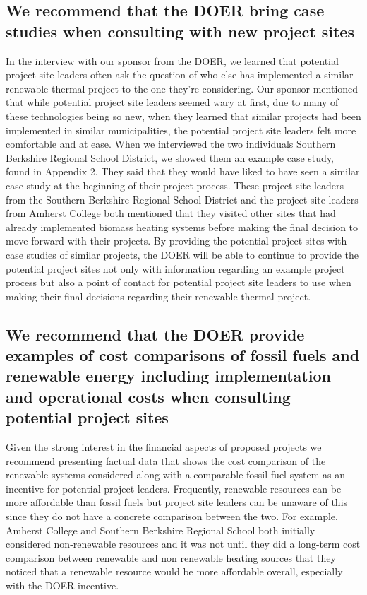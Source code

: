 \subsection{We recommend that the DOER bring case studies when consulting with new project sites}
\par In the interview with our sponsor from the DOER, we learned that potential project site leaders often ask the question of who else has implemented a similar renewable thermal project to the one they’re considering. Our sponsor mentioned that while potential project site leaders seemed wary at first, due to many of these technologies being so new, when they learned that similar projects had been implemented in similar municipalities, the potential project site leaders felt more comfortable and at ease. When we interviewed the two individuals Southern Berkshire Regional School District, we showed them an example case study, found in Appendix 2. They said that they would have liked to have seen a similar case study at the beginning of their project process. These project site leaders from the Southern Berkshire Regional School District and the project site leaders from Amherst College both mentioned that they visited other sites that had already implemented biomass heating systems before making the final decision to move forward with their projects. By providing the potential project sites with case studies of similar projects, the DOER will be able to continue to provide the potential project sites not only with information regarding an example project process but also a point of contact for potential project site leaders to use when making their final decisions regarding their renewable thermal project.

\subsection{We recommend that the DOER provide examples of cost comparisons of fossil fuels and renewable energy including implementation and operational costs when consulting potential project sites}
\par Given the strong interest in the financial aspects of proposed projects we recommend presenting factual data that shows the cost comparison of the renewable systems considered along with a comparable fossil fuel system as an incentive for potential project leaders. Frequently, renewable resources can be more affordable than fossil fuels but project site leaders can be unaware of this since they do not have a concrete comparison between the two. For example, Amherst College and Southern Berkshire Regional School both initially considered non-renewable resources and it was not until they did a long-term cost comparison between renewable and non renewable heating sources that they noticed that a renewable resource would be more affordable overall, especially with the DOER incentive. 

